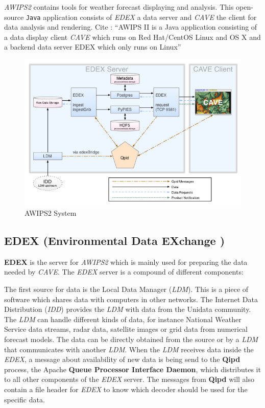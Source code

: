 \documentclass[]{article}
\begin{document}
\emph{AWIPS2} contains tools for weather forecast displaying and
analysis. This open-source \texttt{Java} application consists of
\emph{EDEX} a data server and \emph{CAVE} the client for data analysis
and rendering. \cite{Uni01} Cite : ``AWIPS II is a Java application
consisting of a data display client \emph{CAVE} which runs on Red
Hat/CentOS Linux and OS X and a backend data server EDEX which only runs
on Linux'' \cite{Awips}

\begin{figure}
\centering
\includegraphics{pics/awips2_coms.png}
\caption{AWIPS2 System}
\end{figure}

\subsection{EDEX (Environmental Data EXchange
)}\label{edex-environmental-data-exchange}

\textbf{EDEX} is the server for \emph{AWIPS2} which is mainly used for
preparing the data needed by \emph{CAVE}. The \emph{EDEX} server is a
compound of different components: \cite{AwipsDocs}

The first source for data is the Local Data Manager (\emph{LDM}). This
is a piece of software which shares data with computers in other
networks. The Internet Data Distribution (\emph{IDD}) provides the
\emph{LDM} with data from the Unidata community. The \emph{LDM} can
handle different kinds of data, for instance National Weather Service
data streams, radar data, satellite images or grid data from numerical
forecast models. The data can be directly obtained from the source or by
a \emph{LDM} that communicates with another \emph{LDM}. When the
\emph{LDM} receives data inside the \emph{EDEX}, a message about
availability of new data is being send to the \textbf{Qipd} process, the
Apache \textbf{Queue Processor Interface Daemon}, which distributes it
to all other components of the \emph{EDEX} server. The messages from
\textbf{Qipd} will also contain a file header for \emph{EDEX} to know
which decoder should be used for the specific data.
\end{document}
